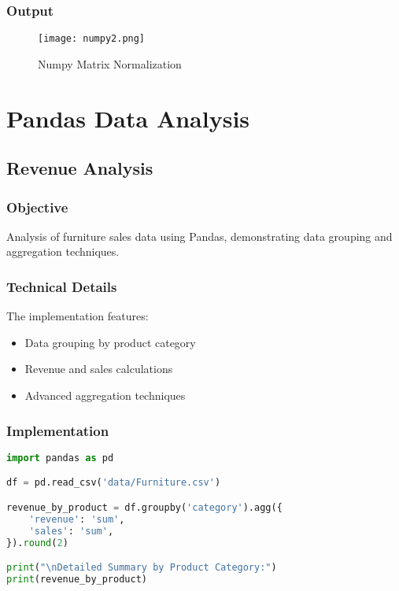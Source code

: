 \documentclass[12pt]{article}
\begin{document}
\subsubsection{Output}
\begin{figure}[h]
    \centering
    \texttt{[image: numpy2.png]}
    \caption{Numpy Matrix Normalization}
    \label{fig:enter-label}
\end{figure}

\section{Pandas Data Analysis}

\subsection{Revenue Analysis\hfill\href{https://github.com/sabbirahmed404/Python-Practice/blob/main/pandas_1.py}{\faGithub}}
\subsubsection{Objective}
Analysis of furniture sales data using Pandas, demonstrating data grouping and aggregation techniques.

\subsubsection{Technical Details}
The implementation features:
\begin{itemize}
    \item Data grouping by product category
    \item Revenue and sales calculations
    \item Advanced aggregation techniques
\end{itemize}

\subsubsection{Implementation}
\begin{lstlisting}[language=Python, caption=Revenue Analysis Implementation]
import pandas as pd

df = pd.read_csv('data/Furniture.csv')

revenue_by_product = df.groupby('category').agg({
    'revenue': 'sum',
    'sales': 'sum',
}).round(2)

print("\nDetailed Summary by Product Category:")
print(revenue_by_product)

\end{lstlisting}
\end{document}
